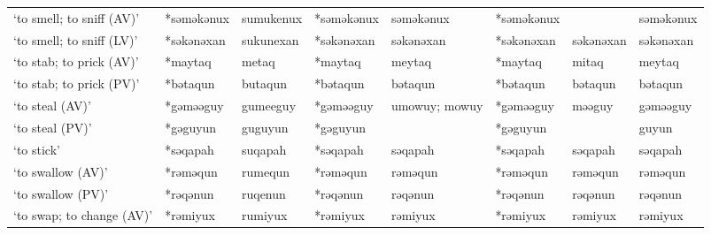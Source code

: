 \begin{landscape}
\begin{longtable}[c]{@{}p{3cm}<{\raggedright}p{2.75cm}<{\raggedright}p{2.75cm}<{\raggedright}p{2.75cm}<{\raggedright}p{2.75cm}<{\raggedright}p{2.75cm}<{\raggedright}p{2.75cm}<{\raggedright}p{2.75cm}<{\raggedright}@{}}
`to smell; to sniff (AV)'                            & *səməkənux   & sumukenux                     & *səməkənux     & səməkənux                  & *səməkənux       &                          & səməkənux                         \\
`to smell; to sniff (LV)'                            & *səkənəxan   & sukunexan                     & *səkənəxan     & səkənəxan                  & *səkənəxan       & səkənəxan                & səkənəxan                         \\
`to stab; to prick (AV)'                             & *maytaq      & metaq                         & *maytaq        & meytaq                     & *maytaq          & mitaq                    & meytaq                            \\
`to stab; to prick (PV)'                             & *bətaqun     & butaqun                       & *bətaqun       & bətaqun                    & *bətaqun         & bətaqun                  & bətaqun                           \\
`to steal (AV)'                                      & *gəməəguy    & gumeeguy                      & *gəməəguy      & umowuy; mowuy              & *gəməəguy        & məəguy                   & gəməəguy                          \\
`to steal (PV)'                                      & *gəguyun     & guguyun                       & *gəguyun       &                            & *gəguyun         &                          & guyun                             \\
`to stick'                                           & *səqapah     & suqapah                       & *səqapah       & səqapah                    & *səqapah         & səqapah                  & səqapah                           \\
`to swallow (AV)'                                    & *rəməqun     & rumequn                       & *rəməqun       & rəməqun                    & *rəməqun         & rəməqun                  & rəməqun                           \\
`to swallow (PV)'                                    & *rəqənun     & ruqenun                       & *rəqənun       & rəqənun                    & *rəqənun         & rəqənun                  & rəqənun                           \\
`to swap; to change (AV)'                            & *rəmiyux     & rumiyux                       & *rəmiyux       & rəmiyux                    & *rəmiyux         & rəmiyux                  & rəmiyux                           \\

\end{longtable}
\end{landscape}
